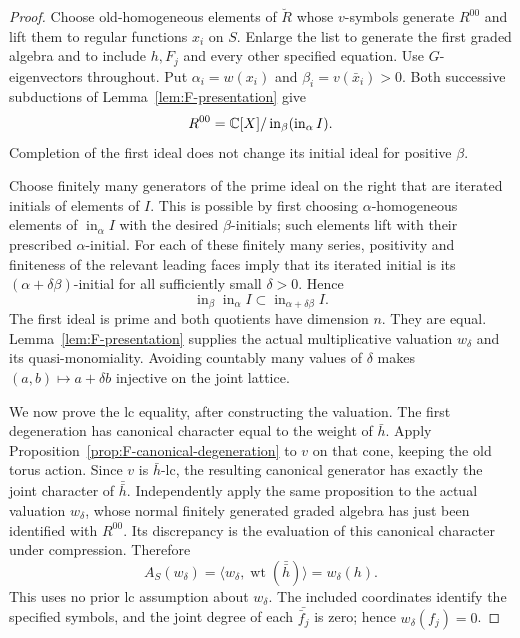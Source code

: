 \begin{proof}
Choose old-homogeneous elements of $\breve R$ whose $v$-symbols
generate $R^{00}$ and lift them to regular functions $x_i$ on
$S$.  Enlarge the list to generate the first graded algebra and
to include $h,F_j$ and every other specified equation.
Use $G$-eigenvectors throughout.  Put
$\alpha_i=w(x_i)$ and $\beta_i=v(\bar x_i)>0$.
Both successive subductions of
Lemma~\ref{lem:F-presentation} give
\begin{equation}\label{eq:F-iterated-initial}
 R^{00}=\mathbb C[X]/\operatorname{in}_\beta
                                  (\operatorname{in}_\alpha I).
\end{equation}
Completion of the first ideal does not change its initial ideal
for positive $\beta$.

Choose finitely many generators of the prime ideal on the right
that are iterated initials of elements of $I$.  This is possible
by first choosing $\alpha$-homogeneous elements of
$\operatorname{in}_\alpha I$ with the desired $\beta$-initials;
such elements lift with their prescribed $\alpha$-initial.
For each of these finitely many series, positivity and finiteness
of the relevant leading faces imply that its iterated initial
is its $(\alpha+\delta\beta)$-initial for all sufficiently small
$\delta>0$.  Hence
\[
 \operatorname{in}_\beta\operatorname{in}_\alpha I
           \subset\operatorname{in}_{\alpha+\delta\beta}I.
\]
The first ideal is prime and both quotients have dimension $n$.
They are equal.  Lemma~\ref{lem:F-presentation} supplies the
actual multiplicative valuation $w_\delta$ and its
quasi-monomiality.  Avoiding countably many values of $\delta$
makes $(a,b)\mapsto a+\delta b$ injective on the joint lattice.

We now prove the lc equality, after constructing the valuation.
The first degeneration has canonical character equal to the
weight of $\bar h$.  Apply
Proposition~\ref{prop:F-canonical-degeneration} to $v$ on that
cone, keeping the old torus action.  Since $v$ is $\bar h$-lc,
the resulting canonical generator has exactly the joint
character of $\bar{\bar h}$.  Independently apply the same
proposition to the actual valuation $w_\delta$, whose normal
finitely generated graded algebra has just been identified with
$R^{00}$.  Its discrepancy is the evaluation of this canonical
character under compression.  Therefore
\begin{equation}\label{eq:F-compressed-lc}
 A_S(w_\delta)
   =\langle w_\delta,\operatorname{wt}(\bar{\bar h})\rangle
   =w_\delta(h).
\end{equation}
This uses no prior lc assumption about $w_\delta$.
The included coordinates identify the specified symbols, and
the joint degree of each $\bar{\bar f_j}$ is zero; hence
$w_\delta(f_j)=0$.


\end{proof}
